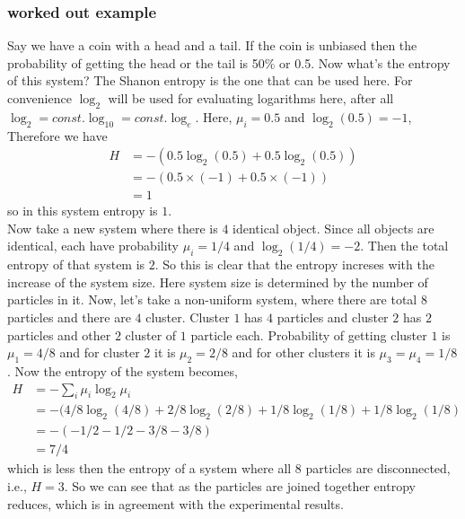 	\subsubsection{worked out example}
	Say we have a coin with a head and a tail. If the coin is unbiased then the probability of getting the head or the tail is 50\% or 0.5. Now what's the entropy of this system? The Shanon entropy is the one that can be used here. For convenience $\log_{2}$ will be used for evaluating logarithms here, after all $\log_{2} = const. \log_{10} = const. \log_{e}$. Here, $\mu_i = 0.5$ and $\log_{2} (0.5) = -1$, Therefore we have
	\begin{align}
		H &= - (0.5 \log_{2} (0.5) + 0.5 \log_{2} (0.5)) \nonumber \\ 
		&= - (0.5 \times (-1) + 0.5 \times (-1)) \nonumber \\ 
		&= 1 \nonumber
	\end{align}
	so in this system entropy is $1$.\\
	Now take a new system where there is $4$ identical object. Since all objects are identical, each have probability $\mu_i = 1/4$ and $\log_{2} (1/4) = -2$. Then the total entropy of that system is $2$. So this is clear that the entropy increses with the increase of the system size. Here system size is determined by the number of particles in it. Now, let's take a non-uniform system, where there are total $8$ particles and there are $4$ cluster. Cluster $1$ has $4$ particles and cluster $2$ has $2$ particles and other $2$ cluster of $1$ particle each. Probability of getting cluster $1$ is $\mu_1 = 4/8$ and for cluster $2$ it is $\mu_2 = 2/8$ and for other clusters it is $\mu_3 = \mu_4 = 1/8$. Now the entropy of the system becomes,
	\begin{align}
		H &= - \sum_i \mu_i \log_2 \mu_i \nonumber \\
		&= - (4/8 \log_2 (4/8) + 2/8 \log_2 (2/8) + 1/8 \log_2(1/8) + 1/8 \log_2(1/8) \nonumber \\
		&= - (-1/2 -1/2 -3/8 -3/8) \nonumber \\
		&= 7/4 \nonumber
	\end{align}
	which is less then the entropy of a system where all $8$ particles are disconnected, i.e., $H=3$. So we can see that as the particles are joined together entropy reduces, which is in agreement with the experimental results. 
